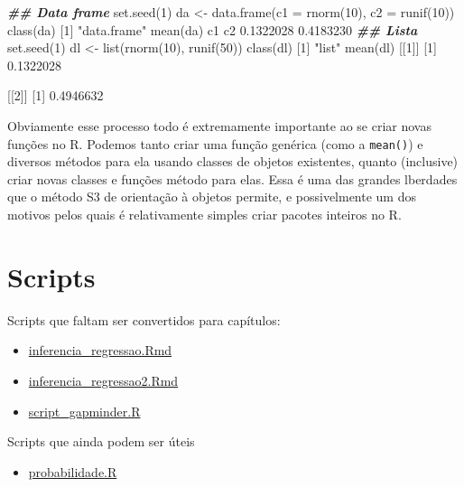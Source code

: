 \documentclass[
  10pt,
  a4paper]{book}
\newenvironment{Shaded}{\begin{snugshade}}{\end{snugshade}}
\newcommand{\AttributeTok}[1]{\textcolor[rgb]{0.77,0.63,0.00}{#1}}
\newcommand{\DecValTok}[1]{\textcolor[rgb]{0.00,0.00,0.81}{#1}}
\newcommand{\DocumentationTok}[1]{\textcolor[rgb]{0.56,0.35,0.01}{\textbf{\textit{#1}}}}
\newcommand{\FloatTok}[1]{\textcolor[rgb]{0.00,0.00,0.81}{#1}}
\newcommand{\FunctionTok}[1]{\textcolor[rgb]{0.00,0.00,0.00}{#1}}
\newcommand{\NormalTok}[1]{#1}
\newcommand{\OtherTok}[1]{\textcolor[rgb]{0.56,0.35,0.01}{#1}}
\newcommand{\StringTok}[1]{\textcolor[rgb]{0.31,0.60,0.02}{#1}}
\providecommand{\tightlist}{%
  \setlength{\itemsep}{0pt}\setlength{\parskip}{0pt}}
\begin{document}
\begin{Shaded}
\begin{Highlighting}[]
\DocumentationTok{\#\# Data frame}
\FunctionTok{set.seed}\NormalTok{(}\DecValTok{1}\NormalTok{)}
\NormalTok{da }\OtherTok{\textless{}{-}} \FunctionTok{data.frame}\NormalTok{(}\AttributeTok{c1 =} \FunctionTok{rnorm}\NormalTok{(}\DecValTok{10}\NormalTok{),}
                 \AttributeTok{c2 =} \FunctionTok{runif}\NormalTok{(}\DecValTok{10}\NormalTok{))}
\FunctionTok{class}\NormalTok{(da)}
\NormalTok{[}\DecValTok{1}\NormalTok{] }\StringTok{"data.frame"}
\FunctionTok{mean}\NormalTok{(da)}
\NormalTok{       c1        c2 }
\FloatTok{0.1322028} \FloatTok{0.4183230} 
\DocumentationTok{\#\# Lista}
\FunctionTok{set.seed}\NormalTok{(}\DecValTok{1}\NormalTok{)}
\NormalTok{dl }\OtherTok{\textless{}{-}} \FunctionTok{list}\NormalTok{(}\FunctionTok{rnorm}\NormalTok{(}\DecValTok{10}\NormalTok{), }\FunctionTok{runif}\NormalTok{(}\DecValTok{50}\NormalTok{))}
\FunctionTok{class}\NormalTok{(dl)}
\NormalTok{[}\DecValTok{1}\NormalTok{] }\StringTok{"list"}
\FunctionTok{mean}\NormalTok{(dl)}
\NormalTok{[[}\DecValTok{1}\NormalTok{]]}
\NormalTok{[}\DecValTok{1}\NormalTok{] }\FloatTok{0.1322028}

\NormalTok{[[}\DecValTok{2}\NormalTok{]]}
\NormalTok{[}\DecValTok{1}\NormalTok{] }\FloatTok{0.4946632}
\end{Highlighting}
\end{Shaded}

Obviamente esse processo todo é extremamente importante ao se criar
novas funções no R. Podemos tanto criar uma função genérica (como a
\texttt{mean()}) e diversos métodos para ela usando classes de objetos
existentes, quanto (inclusive) criar novas classes e funções método para
elas. Essa é uma das grandes lberdades que o método S3 de orientação à
objetos permite, e possivelmente um dos motivos pelos quais é
relativamente simples criar pacotes inteiros no R.

\hypertarget{scripts}{%
\chapter{Scripts}\label{scripts}}

Scripts que faltam ser convertidos para capítulos:

\begin{itemize}
\tightlist
\item
  \href{scripts/inferencia_regressao.Rmd}{inferencia\_regressao.Rmd}
\item
  \href{scripts/inferencia_regressao2.Rmd}{inferencia\_regressao2.Rmd}
\item
  \href{scripts/script_gapminder.R}{script\_gapminder.R}
\end{itemize}

Scripts que ainda podem ser úteis

\begin{itemize}
\tightlist
\item
  \href{scripts/probabilidade.R}{probabilidade.R}
\end{itemize}
\end{document}
